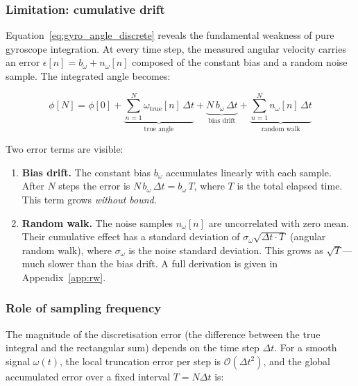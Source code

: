 \subsubsection{Limitation: cumulative drift}
\label{sec:frames:gyro:drift}

Equation~\eqref{eq:gyro_angle_discrete} reveals the fundamental weakness of
pure gyroscope integration. At every time step, the measured angular velocity
carries an error $\epsilon[n] = b_\omega + n_\omega[n]$ composed of the
constant bias and a random noise sample. The integrated angle becomes:

\begin{equation}
  \phi[N] = \phi[0]
           + \underbrace{\sum_{n=1}^{N} \omega_\text{true}[n]\,\Delta t}%
             _{\text{true angle}}
           + \underbrace{N\,b_\omega\,\Delta t}%
             _{\text{bias drift}}
           + \underbrace{\sum_{n=1}^{N} n_\omega[n]\,\Delta t}%
             _{\text{random walk}}
  \label{eq:gyro_drift}
\end{equation}

Two error terms are visible:

\begin{enumerate}
  \item \textbf{Bias drift.} The constant bias $b_\omega$ accumulates linearly
        with each sample. After $N$ steps the error is $N\,b_\omega\,\Delta t
        = b_\omega\,T$, where $T$ is the total elapsed time. This term grows
        \emph{without bound}.
  \item \textbf{Random walk.} The noise samples $n_\omega[n]$ are uncorrelated
        with zero mean. Their cumulative effect has a standard deviation of
        $\sigma_\omega\sqrt{\Delta t \cdot T}$ (angular random walk), where
        $\sigma_\omega$ is the noise standard deviation. This grows as
        $\sqrt{T}$---much slower than the bias drift. A full derivation is
        given in Appendix~\ref{app:rw}.
\end{enumerate}

\subsubsection{Role of sampling frequency}

The magnitude of the discretisation error (the difference between the true
integral and the rectangular sum) depends on the time step $\Delta t$. For a
smooth signal $\omega(t)$, the local truncation error per step is
$\mathcal{O}(\Delta t^2)$, and the global accumulated error over a fixed
interval $T = N\Delta t$ is:

